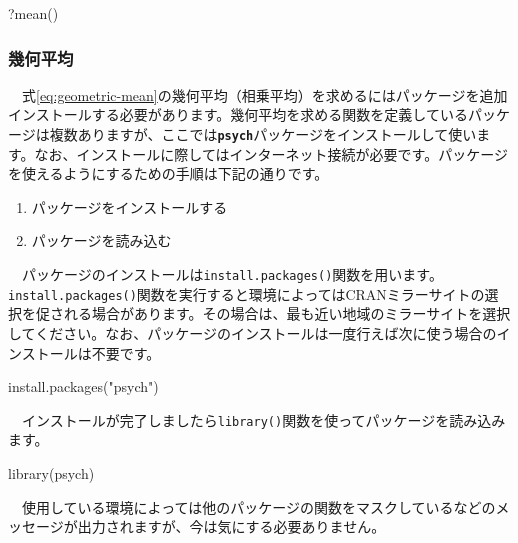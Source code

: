 \documentclass[
  12pt,
]{book}
\newenvironment{Shaded}{\begin{snugshade}}{\end{snugshade}}
\newcommand{\FunctionTok}[1]{\textcolor[rgb]{0.00,0.00,0.00}{#1}}
\newcommand{\NormalTok}[1]{#1}
\newcommand{\StringTok}[1]{\textcolor[rgb]{0.31,0.60,0.02}{#1}}
\providecommand{\tightlist}{%
  \setlength{\itemsep}{0pt}\setlength{\parskip}{0pt}}
\begin{document}
\begin{Shaded}
\begin{Highlighting}[numbers=left,,]
\NormalTok{?}\FunctionTok{mean}\NormalTok{()}
\end{Highlighting}
\end{Shaded}

\hypertarget{ux5e7eux4f55ux5e73ux5747}{%
\subsubsection*{幾何平均}\label{ux5e7eux4f55ux5e73ux5747}}

　式\eqref{eq:geometric-mean}の幾何平均（相乗平均）を求めるにはパッケージを追加インストールする必要があります。幾何平均を求める関数を定義しているパッケージは複数ありますが、ここでは\textbf{\texttt{psych}}パッケージをインストールして使います。なお、インストールに際してはインターネット接続が必要です。パッケージを使えるようにするための手順は下記の通りです。

\begin{enumerate}
\def\labelenumi{\arabic{enumi}.}
\tightlist
\item
  パッケージをインストールする
\item
  パッケージを読み込む
\end{enumerate}

　パッケージのインストールは\texttt{install.packages()}関数を用います。\texttt{install.packages()}関数を実行すると環境によってはCRANミラーサイトの選択を促される場合があります。その場合は、最も近い地域のミラーサイトを選択してください。なお、パッケージのインストールは一度行えば次に使う場合のインストールは不要です。

\begin{Shaded}
\begin{Highlighting}[numbers=left,,]
\FunctionTok{install.packages}\NormalTok{(}\StringTok{"psych"}\NormalTok{)}
\end{Highlighting}
\end{Shaded}

　インストールが完了しましたら\texttt{library()}関数を使ってパッケージを読み込みます。

\begin{Shaded}
\begin{Highlighting}[numbers=left,,]
\FunctionTok{library}\NormalTok{(psych)}
\end{Highlighting}
\end{Shaded}

　使用している環境によっては他のパッケージの関数をマスクしているなどのメッセージが出力されますが、今は気にする必要ありません。
\end{document}
